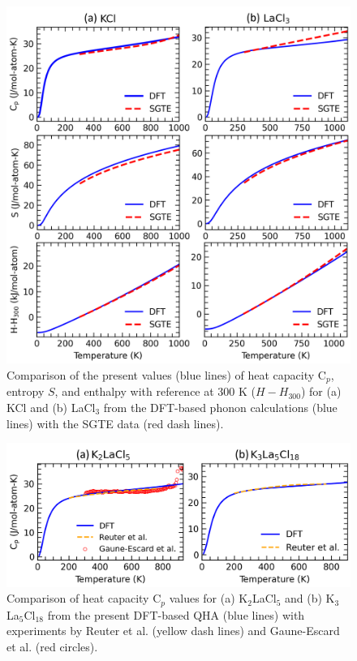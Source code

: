 \begin{figure} [H]
    \centering
    \includegraphics[width=0.9\linewidth]{moltensalts/Moltensalts-LaCl3-Cp-S-H.png}
    \caption{Comparison of the present values (blue lines) of heat capacity C$_p$, entropy $S$, and enthalpy with reference at 300 K ($H-H_{300}$) for (a) KCl and (b) LaCl$_3$ from the DFT-based phonon calculations (blue lines) with the SGTE data \cite{sgteurl} (red dash lines).}
    \label{ms:fig:lacl3pureQHA}
\end{figure}

\begin{figure} [H]
    \centering
    \includegraphics[width=0.9\linewidth]{moltensalts/Moltensalts-LaCl3-Compounds-Cp.png}
    \caption{Comparison of heat capacity C$_p$ values for (a) K$_2$LaCl$_5$ and (b) K$_3$La$_5$Cl$_{18}$ from the present DFT-based QHA (blue lines) with experiments by Reuter et al. \cite{reuter1994heat} (yellow dash lines) and Gaune-Escard et al. \cite{gaune1999heat} (red circles).}
    \label{ms:fig:lacl3CompoundsCp}
\end{figure}

